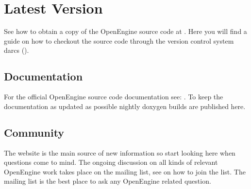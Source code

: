 \section{Latest Version}
See how to obtain a copy of the OpenEngine source code at
. Here you will find a guide on
how to checkout the source code through the version control system
darcs ().

\subsection{Documentation}
For the official OpenEngine source code documentation see:
. To keep the
documentation as updated as possible nightly doxygen builds are
published here.



\subsection{Community}
The website is the main source of new information so start looking
here when questions come to mind. The ongoing discussion on
all kinds of relevant OpenEngine work takes place on the
mailing list, see  on how
to join the list. The mailing list is the best place to ask any
OpenEngine related question.
